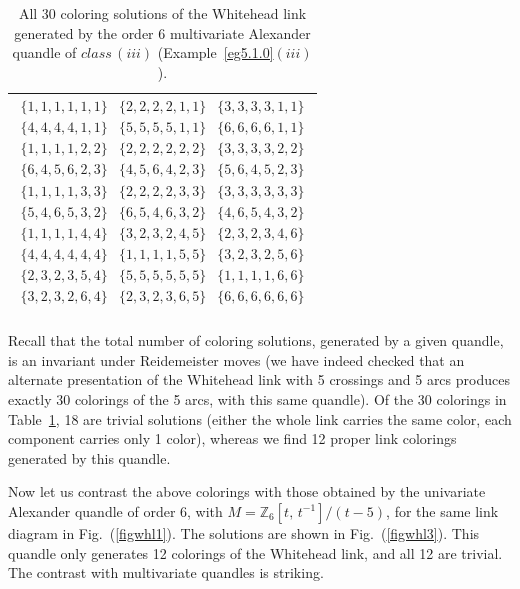 \documentclass[a4paper,12pt]{article}
\begin{document}
\begin{table}[htbp]
\centering 
\begin{tabular}{|c|} 
\hline   
$\begin{array}{c|c|c}
  \{1, 1, 1, 1, 1, 1\} & \{2, 2, 2, 2, 1, 1\} & \{3, 3, 3, 3, 1, 1\} \\   
  \{4, 4, 4, 4, 1, 1\} & \{5, 5, 5, 5, 1, 1\} & \{6, 6, 6, 6, 1, 1\} \\  
  \{1, 1, 1, 1, 2, 2\} & \{2, 2, 2, 2, 2, 2\} & \{3, 3, 3, 3, 2, 2\} \\   
  \{6, 4, 5, 6, 2, 3\} & \{4, 5, 6, 4, 2, 3\} & \{5, 6, 4, 5, 2, 3\} \\  
  \{1, 1, 1, 1, 3, 3\} & \{2, 2, 2, 2, 3, 3\} & \{3, 3, 3, 3, 3, 3\} \\
  \{5, 4, 6, 5, 3, 2\} & \{6, 5, 4, 6, 3, 2\} & \{4, 6, 5, 4, 3, 2\} \\
  \{1, 1, 1, 1, 4, 4\} & \{3, 2, 3, 2, 4, 5\} & \{2, 3, 2, 3, 4, 6\} \\
  \{4, 4, 4, 4, 4, 4\} & \{1, 1, 1, 1, 5, 5\} & \{3, 2, 3, 2, 5, 6\} \\
  \{2, 3, 2, 3, 5, 4\} & \{5, 5, 5, 5, 5, 5\} & \{1, 1, 1, 1, 6, 6\} \\
  \{3, 2, 3, 2, 6, 4\} & \{2, 3, 2, 3, 6, 5\} & \{6, 6, 6, 6, 6, 6\} \\
\end{array}$  \\ 
\hline
\end{tabular}
\caption{All 30 coloring solutions of the Whitehead link generated by the order 6 multivariate Alexander quandle of $class \, (iii)$ (Example~\ref{eg5.1.0}$(iii)$).}
\label{tabc1} 
\end{table}

Recall that the total number of coloring solutions, generated by a given quandle, is an invariant under Reidemeister moves (we have indeed checked that an alternate presentation of the Whitehead link with 5 crossings and 5 arcs  produces exactly 30 colorings of the 5 arcs, with this same quandle). Of the 30 colorings in Table~\ref{tabc1}, 18 are trivial solutions (either the whole link carries the same color, each component carries only 1 color), whereas we find 12 proper link colorings generated by this quandle. 

Now let us contrast the above colorings with those obtained by the univariate Alexander quandle of order 6, with $M = \mathbb{Z}_6 [t, \, t^{-1}]  / (t-5)$, for the same link diagram in Fig.~(\ref{figwhl1}). The solutions are shown in Fig.~(\ref{figwhl3}). This quandle only generates 12 colorings of the Whitehead link, and all 12 are trivial. The contrast with multivariate quandles is striking.   
\end{document}
